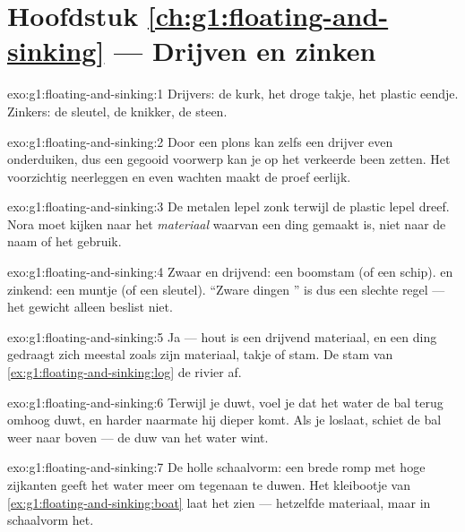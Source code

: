 \section*{Hoofdstuk \ref{ch:g1:floating-and-sinking} --- Drijven en zinken}

\begin{solution}{exo:g1:floating-and-sinking:1}
Drijvers: de kurk, het droge takje, het plastic eendje. Zinkers: de
sleutel, de knikker, de steen.
\end{solution}

\begin{solution}{exo:g1:floating-and-sinking:2}
Door een plons kan zelfs een drijver even onderduiken, dus een
gegooid voorwerp kan je op het verkeerde been zetten. Het voorzichtig
neerleggen en even wachten maakt de proef eerlijk.
\end{solution}

\begin{solution}{exo:g1:floating-and-sinking:3}
De metalen lepel zonk terwijl de plastic lepel dreef. Nora moet
kijken naar het \emph{materiaal} waarvan een ding gemaakt is, niet
naar de naam of het gebruik.
\end{solution}

\begin{solution}{exo:g1:floating-and-sinking:4}
Zwaar en drijvend: een boomstam (of een schip).  en zinkend: een
muntje (of een sleutel). ``Zware dingen '' is dus een slechte
regel --- het gewicht alleen beslist niet.
\end{solution}

\begin{solution}{exo:g1:floating-and-sinking:5}
Ja --- hout is een drijvend materiaal, en een ding gedraagt zich
meestal zoals zijn materiaal, takje of stam. De stam van
\cref{ex:g1:floating-and-sinking:log}  de rivier af.
\end{solution}

\begin{solution}{exo:g1:floating-and-sinking:6}
Terwijl je duwt, voel je dat het water de bal terug omhoog duwt, en
harder naarmate hij dieper komt. Als je loslaat, schiet de bal weer
naar boven --- de duw van het water wint.
\end{solution}

\begin{solution}{exo:g1:floating-and-sinking:7}
De holle schaalvorm: een brede romp met hoge zijkanten geeft het
water meer om tegenaan te duwen. Het kleibootje van
\cref{ex:g1:floating-and-sinking:boat} laat het zien --- hetzelfde
materiaal, maar in schaalvorm  het.
\end{solution}

